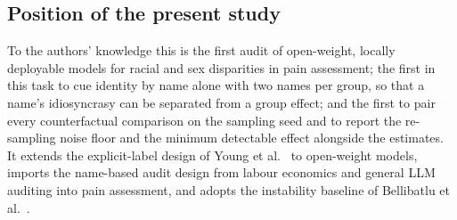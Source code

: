 \subsection{Position of the present study}
To the authors' knowledge this is the first audit of open-weight, locally
deployable models for racial and sex disparities in pain assessment; the first
in this task to cue identity by name alone with two names per group, so that a
name's idiosyncrasy can be separated from a group effect; and the first to pair
every counterfactual comparison on the sampling seed and to report the
re-sampling noise floor and the minimum detectable effect alongside the
estimates. It extends the explicit-label design of Young et al.\
\cite{young2025racial} to open-weight models, imports the name-based audit
design from labour economics and general LLM auditing
\cite{bertrand2004emily, salinas2024name} into pain assessment, and adopts the
instability baseline of Bellibatlu et al.\ \cite{bellibatlu2026instability}.
